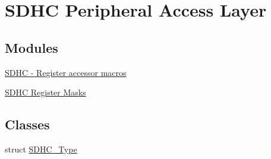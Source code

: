 \hypertarget{group__SDHC__Peripheral__Access__Layer}{}\section{S\+D\+HC Peripheral Access Layer}
\label{group__SDHC__Peripheral__Access__Layer}
\subsection*{Modules}
\begin{DoxyCompactItemize}
\item 
\hyperlink{group__SDHC__Register__Accessor__Macros}{S\+D\+H\+C -\/ Register accessor macros}
\item 
\hyperlink{group__SDHC__Register__Masks}{S\+D\+H\+C Register Masks}
\end{DoxyCompactItemize}
\subsection*{Classes}
\begin{DoxyCompactItemize}
\item 
struct \hyperlink{structSDHC__Type}{S\+D\+H\+C\+\_\+\+Type}
\end{DoxyCompactItemize}

